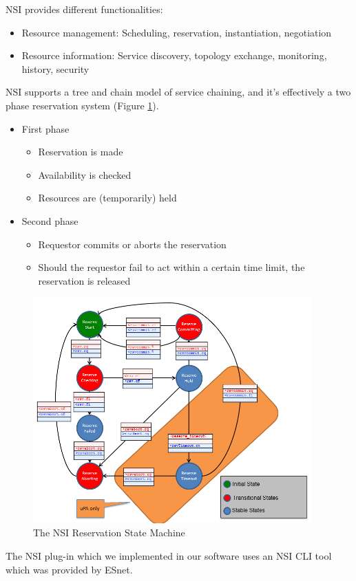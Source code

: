 NSI provides different functionalities:
\begin{itemize}
  \item Resource management: Scheduling, reservation, instantiation, negotiation
  \item Resource information: Service discovery, topology exchange, monitoring, history, security
\end{itemize}

NSI supports a tree and chain model of service chaining, and it's effectively a two 
phase reservation system (Figure \ref{fig:NSI_RSM}).

\begin{itemize}
  \item First phase
	\begin{itemize}
		\item Reservation is made
		\item Availability is checked
		\item Resources are (temporarily) held
	\end{itemize}
  \item Second phase
	\begin{itemize}
		\item Requestor commits or aborts the reservation
		\item Should the requestor fail to act within a certain time limit, the reservation is released
	\end{itemize}
\end{itemize}

\begin{figure}[h]
  \centering
  \includegraphics[width=0.95\textwidth]{Figures/NSI_RSM.png}
  \caption{The NSI Reservation State Machine}
  \label{fig:NSI_RSM}
\end{figure} 

The NSI plug-in which we implemented in our software uses an NSI CLI tool which was provided by 
ESnet.
